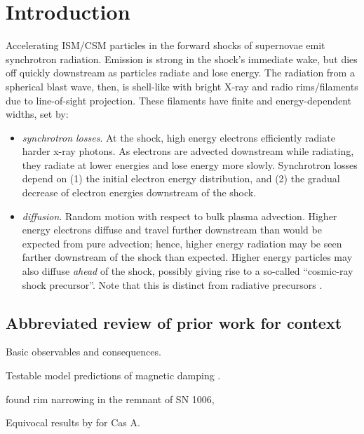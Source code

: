 \documentclass[manuscript]{aastex}  %
\begin{document}
\section{Introduction}


Accelerating ISM/CSM particles in the forward shocks of supernovae emit
synchrotron radiation.  Emission is strong in the shock's immediate wake, but
dies off quickly downstream as particles radiate and lose energy. The radiation
from a spherical blast wave, then, is shell-like with bright X-ray and radio
rims/filaments due to line-of-sight projection.  These filaments have finite
and energy-dependent widths, set by:
\begin{itemize}
  \item \emph{synchrotron losses}.  At the shock, high energy electrons
  efficiently radiate harder x-ray photons.  As electrons are advected
  downstream while radiating, they radiate at lower energies and lose energy
  more slowly.  Synchrotron losses depend on (1) the initial electron energy
  distribution, and (2) the gradual decrease of electron energies downstream of
  the shock.
  \item \emph{diffusion}.  Random motion with respect to bulk plasma advection.
  Higher energy electrons diffuse and travel further downstream than would be
  expected from pure advection; hence, higher energy radiation may be seen
  farther downstream of the shock than expected.
  Higher energy particles may also diffuse \emph{ahead} of the shock, possibly
  giving rise to a so-called ``cosmic-ray shock precursor''.  Note that this is
  distinct from radiative precursors \citep[e.g.,][]{ghavamian2000}.
\end{itemize}

\subsection{Abbreviated review of prior work for context}

Basic observables \citep[e.g.,][]{bamba2003, bamba2005-hist, bamba2005-vela,
parizot2006} and consequences.

Testable model predictions of magnetic damping \citep{pohl2005}.

\citet{ressler2014} found rim narrowing in the remnant of SN 1006,

Equivocal results by \citet{araya2010} for Cas A.
\end{document}
